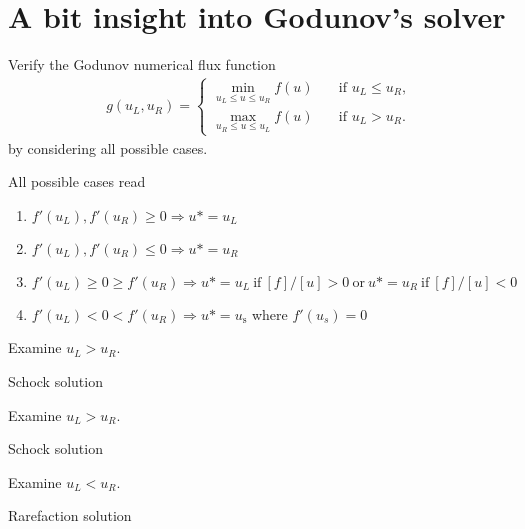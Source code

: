 \documentclass[12pt]{article}
\begin{document}
\section{A bit insight into Godunov's solver}
\begin{example}
	Verify the Godunov numerical flux function
	\begin{align*}
		g(u_L,u_R)
		=
		\begin{cases}
			\underset{ u_L \leq u \leq u_R}{\min}  f(u) \quad & \text{if } u_L \leq u_R , \\
			\underset{ u_R \leq u \leq u_L}{\max}  f(u) \quad & \text{if } u_L > u_R.
		\end{cases}
	\end{align*}
	by considering all possible cases.
\end{example}
All possible cases read
\begin{enumerate}
	\item $f'(u_{L}), f'(u_{R}) \geq 0 \Rightarrow u* = u_{L}$
	\item $f'(u_{L}), f'(u_{R}) \leq 0 \Rightarrow u* = u_{R}$
	\item $f'(u_{L}) \geq 0 \geq f'(u_{R}) \Rightarrow u* = u_{L} \ \text{if} \ [f]/[u] > 0 \ \text{or} \ u*=u_{R} \ \text{if} \ [f]/[u] < 0$
	\item $f'(u_{L}) < 0 < f'(u_{R}) \Rightarrow u* = u_{\text{s}}$ where $f'(u_{s})=0$
\end{enumerate}

\clearpage
\begin{example}
	Examine $u_{L} > u_{R}$.
\end{example}
Schock solution

\clearpage
\begin{example}
	Examine $u_{L} > u_{R}$.
\end{example}
Schock solution

\clearpage
\begin{example}
	Examine $u_{L} < u_{R}$.
\end{example}
Rarefaction solution
\end{document}

